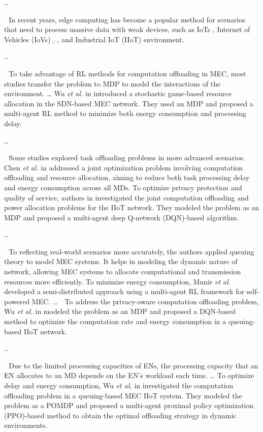 \documentclass[12pt,draftclsnofoot,onecolumn]{IEEEtran}
\newenvironment{my}[2]%
{\begin{list}{}%
{\setlength{\rightmargin}{#1}\setlength{\leftmargin}{#2}}%


 \item[]{}

} {\end{list}}
\begin{document}
\begin{enumerate}
\begin{my}{1cm}{1cm}
{{	\dots
	
	\,\,\,\,In recent years, edge computing has become a popular method for scenarios that need to process massive data with weak devices, such as IoTs \cite{zhang2023multi}, Internet of Vehicles (IoVs) \cite{lin2022multi}, \cite{wei2023many}, and Industrial IoT (IIoT) \cite{yuan2023adaptive} environment.
	
	\dots
	
	\,\,\,\,To take advantage of RL methods for computation offloading in MEC, most studies transfer the problem to MDP to model the interactions of the environment.
	\dots
	Wu \textit{et al.} in \cite{wu2023computation} introduced a stochastic game-based resource allocation in the SDN-based MEC network. They used an MDP and proposed a multi-agent RL method to minimize both energy consumption and processing delay. 
	
	
	\dots
	
	\,\,\,\,Some studies explored task offloading problems in more advanced scenarios. Chen \textit{et al.} in \cite{chen2021drl} addressed a joint optimization problem involving computation offloading and resource allocation, aiming to reduce both task processing delay and energy consumption across all MDs.
	To optimize privacy protection and quality of service, authors in \cite{wu2024privacy} investigated the joint computation offloading and power allocation problems for the IIoT network. They modeled the problem as an MDP and proposed a multi-agent deep Q-network (DQN)-based algorithm.
	
	\dots 
	
	\,\,\,\,To reflecting real-world scenarios more accurately, the authors applied queuing theory to model MEC systems. It helps in modeling the dynamic nature of network, allowing MEC systems to allocate computational and transmission resources more efficiently.
	To minimize energy consumption, Munir \textit{et al.} \cite{munir2021multi} developed a semi-distributed approach using a multi-agent RL framework for self-powered MEC. 
\dots
	\,\,\,\,To address the privacy-aware computation offloading problem, Wu \textit{et al.} in \cite{wu2024combining} modeled the problem as an MDP and proposed a DQN-based method to optimize the computation rate and energy consumption in a queuing-based IIoT network.

	
	\dots 
	
	\,\,\,\,Due to the limited processing capacities of ENs, the processing capacity that an EN allocates to an MD depends on the EN's workload each time. \dots
	To optimize delay and energy consumption, Wu \textit{et al.} in \cite{wu2023multi} investigated the computation offloading problem in a queuing-based MEC IIoT system. They modeled the problem as a POMDP and proposed a multi-agent proximal policy optimization (PPO)-based method to obtain the optimal offloading strategy in dynamic environments.
	
}}
\end{my}
\end{enumerate}
\end{document}
